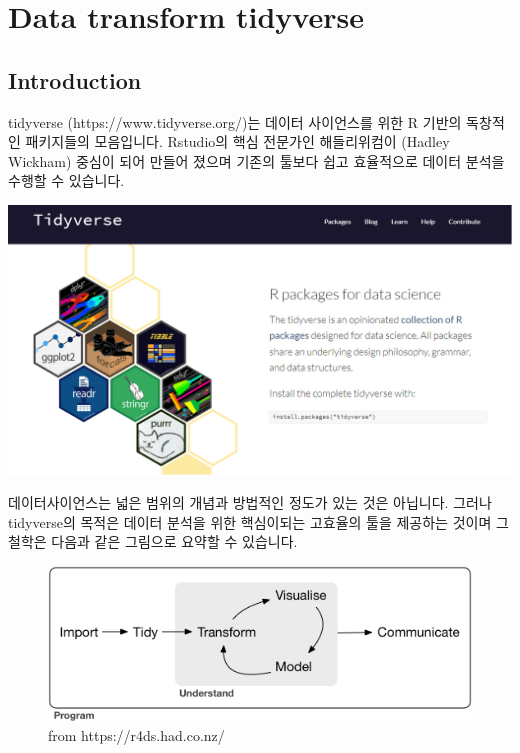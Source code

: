 \documentclass[
  a4paper,
]{book}
\begin{document}

\hypertarget{data-transform-tidyverse}{%
\chapter{Data transform tidyverse}\label{data-transform-tidyverse}}

\hypertarget{introduction-3}{%
\section{Introduction}\label{introduction-3}}

tidyverse (https://www.tidyverse.org/)는 데이터 사이언스를 위한 R 기반의
독창적인 패키지들의 모음입니다. Rstudio의 핵심 전문가인 해들리위컴이
(Hadley Wickham) 중심이 되어 만들어 졌으며 기존의 툴보다 쉽고 효율적으로
데이터 분석을 수행할 수 있습니다.

\includegraphics[width=5.83333in,height=\textheight]{images/image-6982261.png}

데이터사이언스는 넓은 범위의 개념과 방법적인 정도가 있는 것은 아닙니다.
그러나 tidyverse의 목적은 데이터 분석을 위한 핵심이되는 고효율의 툴을
제공하는 것이며 그 철학은 다음과 같은 그림으로 요약할 수 있습니다.

\begin{figure}

{\centering \includegraphics[width=5.66667in,height=\textheight]{images/07/data-science.png}

}

\caption{from https://r4ds.had.co.nz/}

\end{figure}
\end{document}
